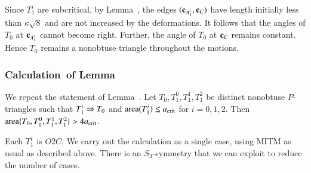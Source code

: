 Since $T_1^i$ are subcritical, by Lemma~, the edges
$({\mathbf c}_{A_1^i},{\mathbf c}_C)$ have length initially less than $\kappa\sqrt8$ and
are not increased by the deformations.  It follows that the angles of $T_0$
at ${\mathbf c}_{A_1^i}$ cannot become right.  Further, the angle of $T_0$ at ${\mathbf c}_C$
remains constant.  Hence $T_0$ remains a nonobtuse triangle throughout
the motions.

\subsubsection{Calculation~of Lemma~} 

We repeat the statement of Lemma~. Let
$T_0,T_1^0,T_1^1,T_1^2$ be distinct nonobtuse $P$-triangles such that
$T_1^i\Rightarrow T_0$ and ${\operatorname{area}}(T_1^i)\le a_\text{crit}$ for $i=0,1,2$. Then ${\operatorname{area}}\{T_0,T_1^0,T_1^1,T_1^2\} >
4a_\text{crit}$. %

Each $T_1^i$ is $O2C$.  We carry out the calculation as a single case,
using MITM as usual as described above.  There is an $S_3$-symmetry %
that we can exploit to reduce the number of cases. 

